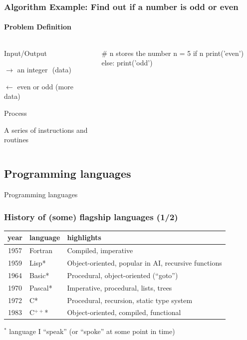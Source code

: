 \documentclass[xcolor=x11names,handout]{beamer}
\begin{document}
\begin{frame}[fragile]
\frametitle{Algorithm Example: Find out if a number is odd or even}
\framesubtitle{Problem Definition}
\begin{columns}

\begin{column}{0.5\textwidth}
\alert{Input/Output}

$\rightarrow$ an integer\,\,\,\,(data)

$\leftarrow$ even or odd 	(more data)	\pause 

\bigskip
\alert{Process}

A series of instructions and routines
\end{column}

\begin{column}{0.4\textwidth}

\begin{python}
# n stores the number
n = 5 
if n%
 	print('even')
else: 
 	print('odd')
\end{python}

\end{column}
\end{columns}
\end{frame}

\begin{frame}
\section{Programming languages}
\centering
\alert{Programming languages}
\end{frame}
 
\begin{frame}
\frametitle{History of (some) flagship languages (1/2)}

\begin{center}
\begin{tabular}{clp{79mm}}
\hline
\bf year	& \bf language	& \bf highlights	\\
\hline
1957	& Fortran	& Compiled, imperative	\\
1959	& Lisp*		& Object-oriented, popular in AI, recursive functions	\\
1964	& Basic*	& Procedural, object-oriented (``goto'')	\\
1970	& Pascal*	& Imperative, procedural, lists, trees	\\
1972	& C*		& Procedural, recursion, static type system	\\
1983	& C$^{++}$*		& Object-oriented, compiled, functional	\\
\hline
\end{tabular}
\end{center}

\bigskip
$^*$ language I ``speak'' (or ``spoke'' at some point in time)
\end{frame}
\end{document}

